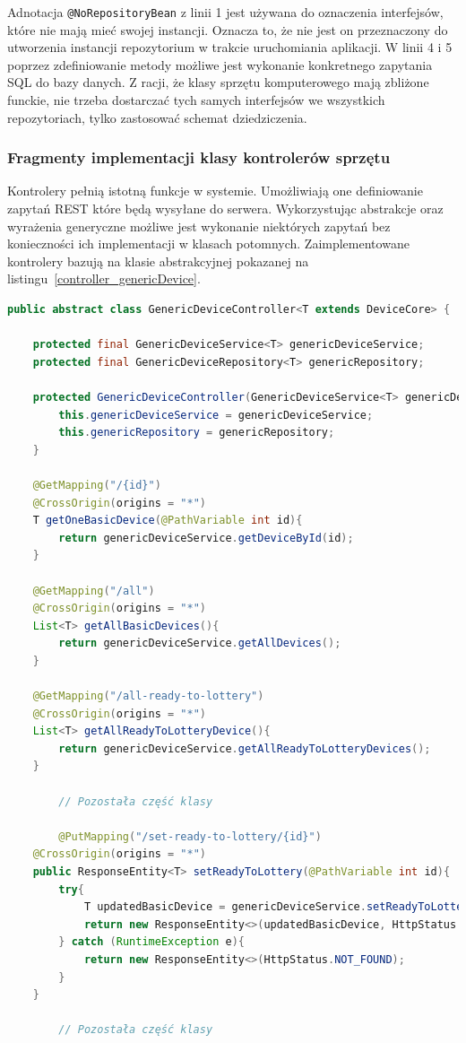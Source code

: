 Adnotacja \texttt{@NoRepositoryBean} z linii 1 jest używana do oznaczenia interfejsów, które nie mają mieć swojej instancji. Oznacza to, że nie jest on przeznaczony do utworzenia instancji repozytorium w trakcie uruchomiania aplikacji. W linii 4 i 5 poprzez zdefiniowanie metody możliwe jest wykonanie konkretnego zapytania SQL do bazy danych. Z racji, że klasy sprzętu komputerowego mają zbliżone funckie, nie trzeba dostarczać tych samych interfejsów we wszystkich repozytoriach, tylko zastosować schemat dziedziczenia.

\subsubsection{Fragmenty implementacji klasy kontrolerów sprzętu}
Kontrolery pełnią istotną funkcje w systemie. Umożliwiają one definiowanie zapytań REST które będą wysyłane do serwera. Wykorzystując abstrakcje oraz wyrażenia generyczne możliwe jest wykonanie niektórych zapytań bez konieczności ich implementacji w klasach potomnych. Zaimplementowane kontrolery bazują na klasie abstrakcyjnej pokazanej na listingu~\ref{controller_genericDevice}.

\begin{lstlisting}[language=Java, style=JavaStyle,  caption={Klasa nadrzędna kontrolera sprzętu: \texttt{GenericDeviceController}}, label={controller_genericDevice}]
public abstract class GenericDeviceController<T extends DeviceCore> {

    protected final GenericDeviceService<T> genericDeviceService;
    protected final GenericDeviceRepository<T> genericRepository;

    protected GenericDeviceController(GenericDeviceService<T> genericDeviceService, GenericDeviceRepository<T> genericRepository) {
        this.genericDeviceService = genericDeviceService;
        this.genericRepository = genericRepository;
    }

    @GetMapping("/{id}")
    @CrossOrigin(origins = "*")
    T getOneBasicDevice(@PathVariable int id){
        return genericDeviceService.getDeviceById(id);
    }

    @GetMapping("/all")
    @CrossOrigin(origins = "*")
    List<T> getAllBasicDevices(){
        return genericDeviceService.getAllDevices();
    }

    @GetMapping("/all-ready-to-lottery")
    @CrossOrigin(origins = "*")
    List<T> getAllReadyToLotteryDevice(){
        return genericDeviceService.getAllReadyToLotteryDevices();
    }
		
		// Pozostała część klasy
		
		@PutMapping("/set-ready-to-lottery/{id}")
    @CrossOrigin(origins = "*")
    public ResponseEntity<T> setReadyToLottery(@PathVariable int id){
        try{
            T updatedBasicDevice = genericDeviceService.setReadyToLottery(id);
            return new ResponseEntity<>(updatedBasicDevice, HttpStatus.OK);
        } catch (RuntimeException e){
            return new ResponseEntity<>(HttpStatus.NOT_FOUND);
        }
    }
		
		// Pozostała część klasy
		
\end{lstlisting}


